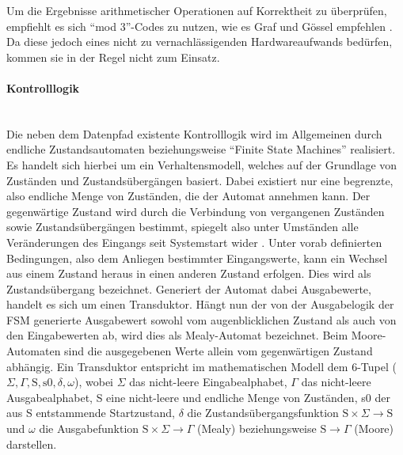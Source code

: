 Um die Ergebnisse arithmetischer Operationen auf Korrektheit zu
überprüfen, empfiehlt es sich "`mod 3"'-Codes zu nutzen, wie es Graf
und Gössel empfehlen \cite{goessel1993}. Da diese jedoch eines nicht
zu vernachlässigenden Hardwareaufwands bedürfen, kommen sie in der
Regel nicht zum Einsatz.

\paragraph{Kontrolllogik}\hspace{0cm}\\
\label{sec:grundlagen_schutz_fsms}
\label{sec:grundlagen_soft_errors_fsms}
Die neben dem Datenpfad existente Kontrolllogik wird im Allgemeinen
durch endliche Zustandsautomaten beziehungsweise ``Finite State
Machines'' realisiert. Es handelt sich hierbei um ein
Verhaltensmodell, welches auf der Grundlage von Zuständen und
Zustandsübergängen basiert. Dabei existiert nur eine begrenzte, also
endliche Menge von Zuständen, die der Automat annehmen kann. Der
gegenwärtige Zustand wird durch die Verbindung von vergangenen
Zuständen sowie Zustandsübergängen bestimmt, spiegelt also unter
Umständen alle Veränderungen des Eingangs seit Systemstart wider
\cite{booth1967}. Unter vorab definierten Bedingungen, also dem
Anliegen bestimmter Eingangswerte, kann ein Wechsel aus einem Zustand
heraus in einen anderen Zustand erfolgen. Dies wird als
Zustandsübergang bezeichnet. Generiert der Automat dabei Ausgabewerte,
handelt es sich um einen Transduktor. Hängt nun der von der
Ausgabelogik der FSM generierte Ausgabewert sowohl vom
augenblicklichen Zustand als auch von den Eingabewerten ab, wird dies
als Mealy-Automat bezeichnet. Beim Moore-Automaten sind die
ausgegebenen Werte allein vom gegenwärtigen Zustand abhängig. Ein
Transduktor entspricht im mathematischen Modell dem 6-Tupel ($\Sigma,
\Gamma, \text{S},\text{s0}, \delta, \omega$), wobei $\Sigma$ das
nicht-leere Eingabealphabet, $\Gamma$ das nicht-leere Ausgabealphabet,
S eine nicht-leere und endliche Menge von Zuständen, s0 der aus S
entstammende Startzustand, $\delta$ die Zustandsübergangsfunktion
$\text{S} \times \Sigma \rightarrow \text{S}$ und $\omega$ die
Ausgabefunktion $\text{S} \times \Sigma \rightarrow \Gamma$ (Mealy)
beziehungsweise $\text{S} \rightarrow \Gamma$ (Moore) darstellen.

